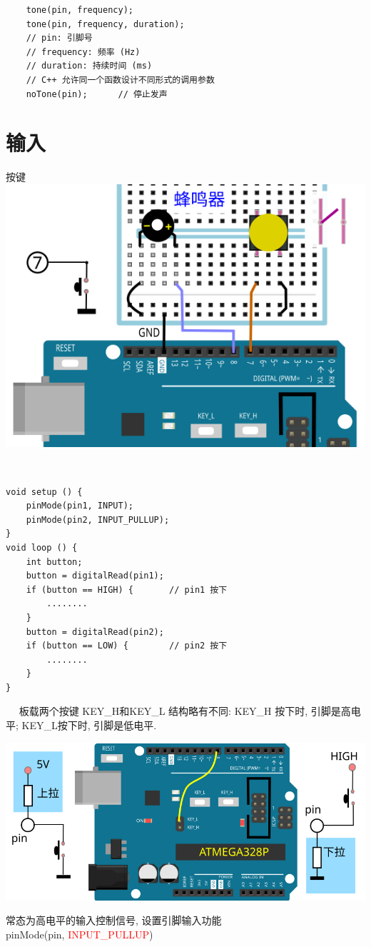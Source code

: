 \documentclass[a4paper,11pt]{seminar}
\newcommand{\alert}[1]{\textcolor{red}{#1}}
\begin{document}
\begin{lstlisting}
    tone(pin, frequency);
    tone(pin, frequency, duration);
    // pin: 引脚号
    // frequency: 频率 (Hz)
    // duration: 持续时间 (ms)
    // C++ 允许同一个函数设计不同形式的调用参数
    noTone(pin);      // 停止发声
\end{lstlisting}
\endslide

\chapter{输入}{按键}
\centering
\includegraphics[width=.8\textwidth]{key}
\endslide

~\ \vskip-6mm
\begin{lstlisting}
void setup () {
    pinMode(pin1, INPUT);
    pinMode(pin2, INPUT_PULLUP);
}
void loop () {
    int button;
    button = digitalRead(pin1);
    if (button == HIGH) {       // pin1 按下
        ........
    }
    button = digitalRead(pin2);
    if (button == LOW) {        // pin2 按下
        ........
    }
}
\end{lstlisting}
\endslide

~\ \vskip-6mm
板载两个按键 KEY\_H和KEY\_L 结构略有不同: KEY\_H 按下时, 引脚是高电平;
KEY\_L按下时, 引脚是低电平.

\begin{center}
\includegraphics[width=.76\textwidth]{onboardkey}
\end{center}
常态为高电平的输入控制信号, 设置引脚输入功能 \\
pinMode(pin, \alert{INPUT\_PULLUP})
\endslide
\end{document}
